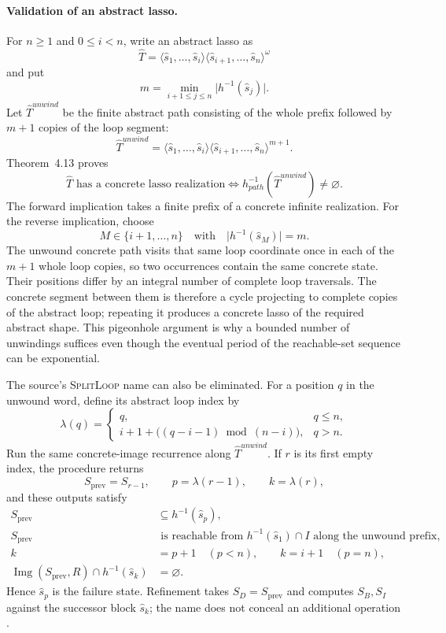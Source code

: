 \paragraph{Validation of an abstract lasso.}
For \(n\geq1\) and \(0\leq i<n\), write an abstract lasso as
\[
 \widehat T=
 \langle\widehat s_1,\ldots,\widehat s_i\rangle
 \langle\widehat s_{i+1},\ldots,\widehat s_n\rangle^\omega
\]
and put
\[
 m=\min_{i+1\le j\le n}
      \lvert h^{-1}(\widehat s_j)\rvert.
\]
Let \(\widehat T^{unwind}\) be the finite abstract path consisting of the
whole prefix followed by \(m+1\) copies of the loop segment:
\[
 \widehat T^{unwind}
 =
 \langle\widehat s_1,\ldots,\widehat s_i\rangle
 \langle\widehat s_{i+1},\ldots,\widehat s_n\rangle^{m+1}.
\]
Theorem~4.13 proves
\[
 \widehat T\text{ has a concrete lasso realization}
 \iff
 h^{-1}_{path}(\widehat T^{unwind})\ne\varnothing.
\]
The forward implication takes a finite prefix of a concrete infinite
realization.  For the reverse implication, choose
\[
 M\in\{i+1,\ldots,n\}
 \quad\text{with}\quad
 \lvert h^{-1}(\widehat s_M)\rvert=m.
\]
The unwound concrete path visits that same loop coordinate once in each of the
\(m+1\) whole loop copies, so two occurrences contain the same concrete
state.  Their positions differ by an integral number of complete loop
traversals.  The concrete segment between them is therefore a cycle projecting
to complete copies of the abstract loop; repeating it produces a concrete
lasso of the required abstract shape.  This pigeonhole argument is why a
bounded number of unwindings suffices even though the eventual period of the
reachable-set sequence can be exponential.

The source's \textsc{SplitLoop} name can also be eliminated.  For a position
\(q\) in the unwound word, define its abstract loop index by
\[
 \lambda(q)=
 \begin{cases}
  q,&q\le n,\\
  i+1+\bigl((q-i-1)\bmod(n-i)\bigr),&q>n.
 \end{cases}
\]
Run the same concrete-image recurrence along
\(\widehat T^{unwind}\).  If \(r\) is its first empty index, the procedure
returns
\[
 S_{\mathrm{prev}}=S_{r-1},\qquad
 p=\lambda(r-1),\qquad k=\lambda(r),
\]
and these outputs satisfy
\[
\begin{aligned}
 S_{\mathrm{prev}}&\subseteq h^{-1}(\widehat s_p),\\
 S_{\mathrm{prev}}&\text{ is reachable from }
   h^{-1}(\widehat s_1)\cap I\text{ along the unwound prefix},\\
 k&=p+1\quad(p<n),\qquad k=i+1\quad(p=n),\\
 \operatorname{Img}(S_{\mathrm{prev}},R)
   \cap h^{-1}(\widehat s_k)&=\varnothing.
\end{aligned}
\]
Hence \(\widehat s_p\) is the failure state.  Refinement takes
\(S_D=S_{\mathrm{prev}}\) and computes \(S_B,S_I\) against the successor block
\(\widehat s_k\); the name does not conceal an additional operation
\cite[ex.~4.12, thm.~4.13, and fig.~9; pp.~774--776]{ClarkeEtAl2003}.

